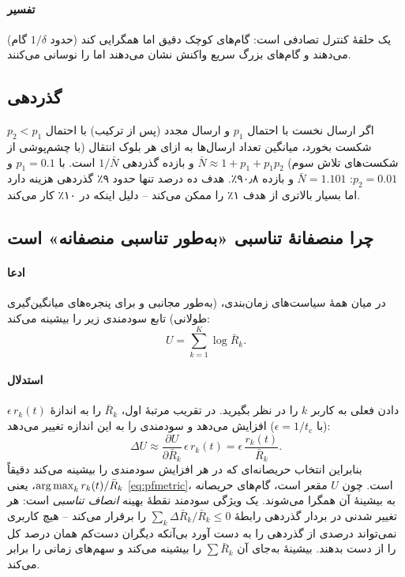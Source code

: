 \documentclass[11pt,a4paper]{article}
\begin{document}
\paragraph{تفسیر}  یک حلقهٔ کنترل تصادفی است: گام‌های کوچک  دقیق اما همگرایی کند (حدود
$1/\delta$ گام) می‌دهند و گام‌های بزرگ سریع واکنش نشان می‌دهند اما  را نوسانی می‌کنند.

\subsection{گذردهی }
اگر ارسال نخست با احتمال $p_1$ و ارسال مجدد (پس از ترکیب) با احتمال $p_2 < p_1$ شکست بخورد، میانگین تعداد
ارسال‌ها به ازای هر بلوک انتقال (با چشم‌پوشی از شکست‌های تلاش سوم) $\bar N \approx 1 + p_1 + p_1p_2$ و بازده
گذردهی $1/\bar N$ است. با $p_1 = 0.1$ و $p_2 = 0.01$: $\bar N = 1.101$ و بازده ۹۰٫۸٪. هدف  ده درصد تنها
حدود ۹٪ گذردهی هزینه دارد اما  بسیار بالاتری از هدف ۱٪ را ممکن می‌کند -- دلیل اینکه  در ۱۰٪
کار می‌کند.

\subsection{چرا منصفانهٔ تناسبی «به‌طور تناسبی منصفانه» است}\label{sec:pf}
\paragraph{ادعا} در میان همهٔ سیاست‌های زمان‌بندی،  (به‌طور مجانبی و برای پنجره‌های میانگین‌گیری طولانی)
تابع سودمندی زیر را بیشینه می‌کند:
\begin{equation}\label{eq:util}
  U = \sum_{k=1}^{K}\log \bar R_k .
\end{equation}
\paragraph{استدلال} دادن  فعلی به کاربر $k$ را در نظر بگیرید. در تقریب مرتبهٔ اول، $\bar R_k$ را به اندازهٔ
$\epsilon\,r_k(t)$ (با $\epsilon = 1/t_\mathrm{c}$) افزایش می‌دهد و سودمندی را به این اندازه تغییر می‌دهد:
\begin{equation}
  \Delta U \approx \frac{\partial U}{\partial \bar R_k}\,\epsilon\,r_k(t) = \epsilon\,\frac{r_k(t)}{\bar R_k}.
\end{equation}
بنابراین انتخاب حریصانه‌ای که در هر  افزایش سودمندی را بیشینه می‌کند دقیقاً $\operatorname{arg\,max}_k r_k(t)/\bar R_k$،
یعنی \cref{eq:pfmetric}، است. چون $U$ مقعر است، گام‌های حریصانه به بیشینهٔ آن همگرا می‌شوند. یک ویژگی سودمند
نقطهٔ بهینه \emph{انصاف تناسبی} است: هر تغییر شدنی در بردار گذردهی رابطهٔ $\sum_k \Delta\bar R_k/\bar R_k \le 0$
را برقرار می‌کند -- هیچ کاربری نمی‌تواند درصدی از گذردهی را به دست آورد بی‌آنکه دیگران دست‌کم همان درصد کل را از
دست بدهند. بیشینهٔ  به‌جای آن $\sum \bar R_k$ را بیشینه می‌کند و  سهم‌های زمانی را برابر می‌کند.
\end{document}
